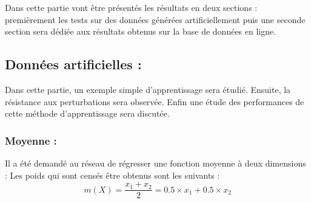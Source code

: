 

Dans cette partie vont être présentés les résultats en deux sections :
premièrement les tests sur des données générées artificiellement
puis une seconde section sera dédiée aux résultats obtenus sur la base de données en ligne.


\subsection{Données artificielles :}\label{subsec:artif}


Dans cette partie, un exemple simple d'apprentissage sera étudié.
Ensuite, la résistance aux perturbations sera observée.
Enfin une étude des performances de cette méthode d'apprentissage sera discutée.


\subsubsection{Moyenne :}\label{subsubsec:moy}
Il a été demandé au réseau de régresser une fonction moyenne à deux dimensions :
Les poids qui sont censés être obtenus sont les suivants :
\begin{equation}
    \label{eq:moy}
    m(X) =\frac{x_1 + x_2}{2} = 0.5 \times x_1 + 0.5 \times x_2
\end{equation}

